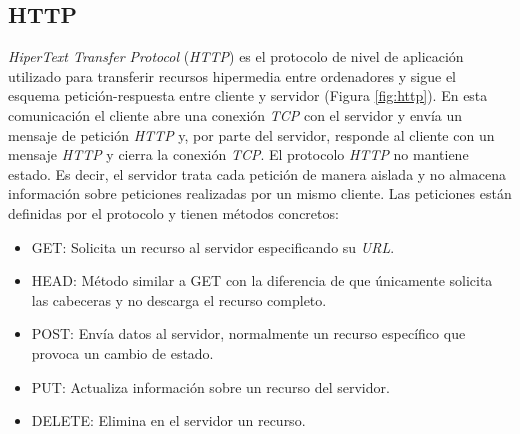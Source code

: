 \subsection{HTTP}
\label{subsec:http}
\textit{HiperText Transfer Protocol} (\textit{HTTP}) es el protocolo de nivel de aplicación utilizado para transferir recursos hipermedia entre ordenadores y sigue el esquema petición-respuesta entre cliente y servidor (Figura \ref{fig:http}). En esta comunicación el cliente abre una conexión \textit{TCP} con el servidor y envía un mensaje de petición \textit{HTTP} y, por parte del servidor, responde al cliente con un mensaje \textit{HTTP} y cierra la conexión \textit{TCP}.
El protocolo \textit{HTTP} no mantiene estado. Es decir, el servidor trata cada petición de manera aislada y no almacena información sobre peticiones realizadas por un mismo cliente.
Las peticiones están definidas por el protocolo y tienen métodos concretos:
\begin{itemize}
    \item GET: Solicita un recurso al servidor especificando su \textit{URL}.
    \item HEAD: Método similar a GET con la diferencia de que únicamente solicita las cabeceras y no descarga el recurso completo.
    \item POST: Envía datos al servidor, normalmente un recurso específico que provoca un cambio de estado.
    \item PUT: Actualiza información sobre un recurso del servidor.
    \item DELETE: Elimina en el servidor un recurso.
\end{itemize}


